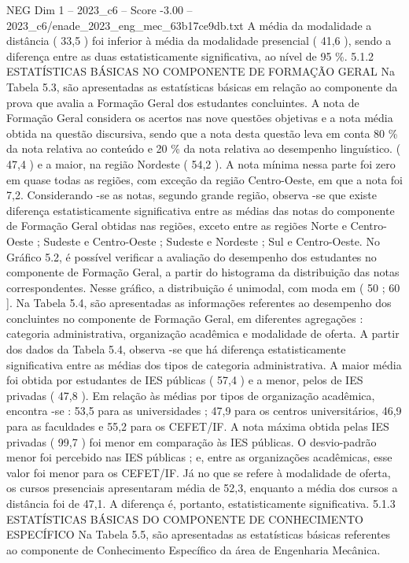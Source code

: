 \begin{textsample}{NEG Dim 1 – 2023\_c6 – Score -3.00 – 2023\_c6/enade\_2023\_eng\_mec\_63b17ce9db.txt}
A média da modalidade a distância ( 33,5 ) foi inferior à média da modalidade presencial ( 41,6 ), sendo a diferença entre as duas estatisticamente significativa, ao nível de 95 \%. 5.1.2 ESTATÍSTICAS BÁSICAS NO COMPONENTE DE FORMAÇÃO GERAL Na Tabela 5.3, são apresentadas as estatísticas básicas em relação ao componente da prova que avalia a Formação Geral dos estudantes concluintes.
A nota de Formação Geral considera os acertos nas nove questões objetivas e a nota média obtida na questão discursiva, sendo que a nota desta questão leva em conta 80 \% da nota relativa ao conteúdo e 20 \% da nota relativa ao desempenho linguístico. ( 47,4 ) e a maior, na região Nordeste ( 54,2 ).
A nota mínima nessa parte foi zero em quase todas as regiões, com exceção da região Centro-Oeste, em que a nota foi 7,2.
Considerando -se as notas, segundo grande região, observa -se que existe diferença estatisticamente significativa entre as médias das notas do componente de Formação Geral obtidas nas regiões, exceto entre as regiões Norte e Centro-Oeste ; Sudeste e Centro-Oeste ; Sudeste e Nordeste ; Sul e Centro-Oeste.
No Gráfico 5.2, é possível verificar a avaliação do desempenho dos estudantes no componente de Formação Geral, a partir do histograma da distribuição das notas correspondentes.
Nesse gráfico, a distribuição é unimodal, com moda em ( 50 ; 60 ].
Na Tabela 5.4, são apresentadas as informações referentes ao desempenho dos concluintes no componente de Formação Geral, em diferentes agregações : categoria administrativa, organização acadêmica e modalidade de oferta.
A partir dos dados da Tabela 5.4, observa -se que há diferença estatisticamente significativa entre as médias dos tipos de categoria administrativa.
A maior média foi obtida por estudantes de IES públicas ( 57,4 ) e a menor, pelos de IES privadas ( 47,8 ).
Em relação às médias por tipos de organização acadêmica, encontra -se : 53,5 para as universidades ; 47,9 para os centros universitários, 46,9 para as faculdades e 55,2 para os CEFET/IF.
A nota máxima obtida pelas IES privadas ( 99,7 ) foi menor em comparação às IES públicas.
O desvio-padrão menor foi percebido nas IES públicas ; e, entre as organizações acadêmicas, esse valor foi menor para os CEFET/IF.
Já no que se refere à modalidade de oferta, os cursos presenciais apresentaram média de 52,3, enquanto a média dos cursos a distância foi de 47,1.
A diferença é, portanto, estatisticamente significativa. 5.1.3 ESTATÍSTICAS BÁSICAS DO COMPONENTE DE CONHECIMENTO ESPECÍFICO Na Tabela 5.5, são apresentadas as estatísticas básicas referentes ao componente de Conhecimento Específico da área de Engenharia Mecânica.

\end{textsample}
